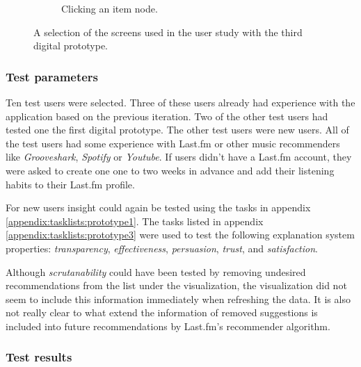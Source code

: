 \begin{figure}
\begin{subfigure}[t]{0.3\textwidth}
					\caption{Clicking an item node.}
					\label{figure:prototype_soundsuggest3_item_click}
	\end{subfigure}
	\caption{A selection of the screens used in the user study with the third digital prototype.}%
	\label{figure:prototype_soundsuggest3}%
\end{figure}



\subsubsection{Test parameters}\label{chapter:prototype:section:soundsuggest3:setup}

Ten test users were selected. Three of these users already had experience with the application based on the previous iteration. Two of the other test users had tested one the first digital prototype. The other test users were new users. All of the test users had some experience with Last.fm or other music recommenders like \emph{Grooveshark}, \emph{Spotify} or \emph{Youtube}. If users didn't have a Last.fm account, they were asked to create one one to two weeks in advance and add their listening habits to their Last.fm profile.


For new users insight could again be tested using the tasks in appendix \ref{appendix:tasklists:prototype1}. The tasks listed in appendix \ref{appendix:tasklists:prototype3} were used to test the following explanation system properties: \emph{transparency}, \emph{effectiveness}, \emph{persuasion}, \emph{trust}, and \emph{satisfaction}.

Although \emph{scrutanability} could have been tested by removing undesired recommendations from the list under the visualization, the visualization did not seem to include this information immediately when refreshing the data. It is also not really clear to what extend the information of removed suggestions is included into future recommendations by Last.fm's recommender algorithm.



\subsubsection{Test results}\label{chapter:prototype:section:soundsuggest3:results}


